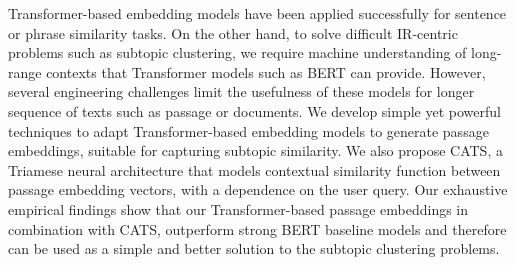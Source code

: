 Transformer-based embedding models have been applied successfully for sentence or phrase similarity tasks. On the other hand, to solve difficult IR-centric problems such as subtopic clustering, we require machine understanding of long-range contexts  that Transformer models such as BERT can provide. However, several engineering challenges limit the usefulness of these models for longer sequence of texts such as passage or documents. We develop simple yet powerful techniques to adapt Transformer-based embedding models to generate passage embeddings, suitable for capturing subtopic similarity. We also propose CATS, a Triamese neural architecture that models contextual similarity function between passage embedding vectors, with a dependence on the user query. Our exhaustive empirical findings show that our Transformer-based passage embeddings in combination with CATS, outperform strong BERT baseline models and therefore can be used as a simple and better solution to the subtopic clustering problems.